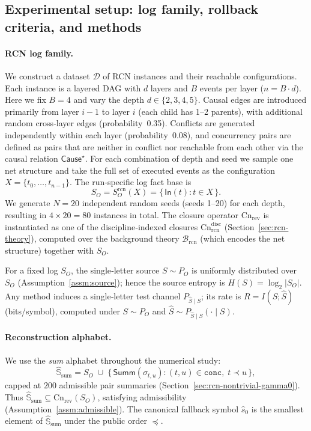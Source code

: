 \documentclass[twoside]{article}
\newcommand{\Cn}{\mathrm{Cn}}
\newcommand{\1}{\mathbf{1}}
\begin{document}
\subsection{Experimental setup: log family, rollback criteria, and methods}
\label{sec:exp61-setup}

\paragraph{RCN log family.}
We construct a dataset \(\mathcal{D}\) of RCN instances and their reachable configurations.
Each instance is a layered DAG with \(d\) layers and \(B\) events per layer (\(n=B\cdot d\)).
Here we fix \(B = 4\) and vary the depth \(d\in\{2,3,4,5\}\).
Causal edges are introduced primarily from layer \(i-1\) to layer \(i\) (each child
has 1–2 parents), with additional random cross‑layer edges (probability~0.35).
Conflicts are generated independently within each layer (probability~0.08),
and concurrency pairs are defined as pairs that are neither in conflict nor
reachable from each other via the causal relation \(\mathsf{Cause}^\star\).
For each combination of depth and seed we sample one net structure and take
the full set of executed events as the configuration \(X = \{t_0,\dots,t_{n-1}\}\).
The run‑specific log fact base is
\[
S_O = S_O^{\mathrm{rcn}}(X) = \{\,\mathsf{In}(t): t\in X\,\}.
\]
We generate \(N = 20\) independent random seeds (seeds 1–20) for each depth,
resulting in \(4\times 20 = 80\) instances in total.
The closure operator \(\Cn_{\mathrm{rev}}\) is instantiated as one of the
discipline‑indexed closures \(\Cn^{\mathrm{disc}}_{\mathrm{rcn}}\)
(Section~\ref{sec:rcn-theory}), computed over the background theory
\(\mathcal{B}_{\mathrm{rcn}}\) (which encodes the net structure) together with \(S_O\).

For a fixed log \(S_O\), the single‑letter source \(S\sim P_O\) is uniformly
distributed over \(S_O\) (Assumption~\ref{assm:source}); hence the source entropy
is \(H(S)=\log_2|S_O|\).  
Any method induces a single‑letter test channel \(P_{\hat S\mid S}\); its rate is
\(R = I(S;\hat S)\) (bits/symbol), computed under \(S\sim P_O\) and
\(\hat S\sim P_{\hat S\mid S}(\cdot\mid S)\).

\paragraph{Reconstruction alphabet.}
We use the \emph{sum} alphabet throughout the numerical study:
\[
\hat{\mathbb S}_{\mathrm{sum}} =
S_O \;\cup\; \{\,\mathsf{Summ}(\sigma_{t,u}): (t,u)\in\mathtt{conc},\; t\prec u\,\},
\]
capped at \(200\) admissible pair summaries (Section~\ref{sec:rcn-nontrivial-gamma0}).
Thus \(\hat{\mathbb S}_{\mathrm{sum}}\subseteq\Cn_{\mathrm{rev}}(S_O)\),
satisfying admissibility (Assumption~\ref{assm:admissible}).
The canonical fallback symbol \(\hat s_0\) is the smallest element of
\(\hat{\mathbb S}_{\mathrm{sum}}\) under the public order \(\preceq\).
\end{document}

